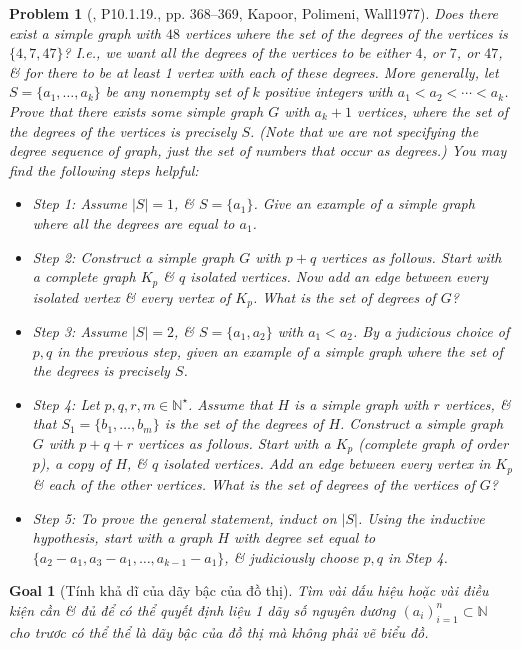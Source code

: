 \documentclass[oneside]{book}
\newtheorem{goal}{Goal}
\newtheorem{problem}{Problem}
\begin{document}
\begin{problem}[\cite{Shahriari2022}, P10.1.19., pp. 368--369, Kapoor, Polimeni, Wall1977]
	Does there exist a simple graph with $48$ vertices where the set of the degrees of the vertices is $\{4,7,47\}$? I.e., we want all the degrees of the vertices to be either $4$, or $7$, or $47$, \& for there to be at least 1 vertex with each of these degrees. More generally, let $S = \{a_1,\ldots,a_k\}$ be any nonempty set of $k$ positive integers with $a_1 < a_2 < \cdots < a_k$. Prove that there exists some simple graph $G$ with $a_k + 1$ vertices, where the set of the degrees of the vertices is precisely $S$. (Note that we are not specifying the degree sequence of graph, just the set of numbers that occur as degrees.) You may find the following steps helpful:
	\begin{itemize}
		\item Step 1: Assume $|S| = 1$, \& $S = \{a_1\}$. Give an example of a simple graph where all the degrees are equal to $a_1$.
		\item Step 2: Construct a simple graph $G$ with $p + q$ vertices as follows. Start with a complete graph $K_p$ \& $q$ isolated vertices. Now add an edge between every isolated vertex \& every vertex of $K_p$. What is the set of degrees of $G$?
		\item Step 3: Assume $|S| = 2$, \& $S = \{a_1,a_2\}$ with $a_1 < a_2$. By a judicious choice of $p,q$ in the previous step, given an example of a simple graph where the set of the degrees is precisely $S$.
		\item Step 4: Let $p,q,r,m\in\mathbb{N}^\star$. Assume that $H$ is a simple graph with $r$ vertices, \& that $S_1 = \{b_1,\ldots,b_m\}$ is the set of the degrees of $H$. Construct a simple graph $G$ with $p + q + r$ vertices as follows. Start with a $K_p$ (complete graph of order $p$), a copy of $H$, \& $q$ isolated vertices. Add an edge between every vertex in $K_p$ \& each of the other vertices. What is the set of degrees of the vertices of $G$?
		\item Step 5: To prove the general statement, induct on $|S|$. Using the inductive hypothesis, start with a graph $H$ with degree set equal to $\{a_2 - a_1,a_3 - a_1,\ldots,a_{k-1} - a_1\}$, \& judiciously choose $p,q$ in Step 4.
	\end{itemize}
\end{problem}

\begin{goal}[Tính khả dĩ của dãy bậc của đồ thị]
	Tìm vài dấu hiệu hoặc vài điều kiện cần \& đủ để có thể quyết định liệu 1 dãy số nguyên dương $(a_i)_{i=1}^n\subset\mathbb{N}$ cho trươc có  thể thể là dãy bậc của đồ thị mà không phải vẽ biểu đồ.
\end{goal}
\end{document}
